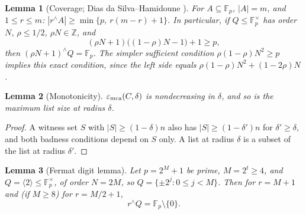 \documentclass[11pt]{article}
\newtheorem{lemma}[lemma]{Lemma}
\theoremstyle{definition}
\newcommand{\F}{\mathbb F}
\newcommand{\Z}{\mathbb Z}
\newcommand{\eps}{\varepsilon}
\begin{document}
\begin{lemma}[Coverage; Dias da Silva--Hamidoune \cite{DDSH94}]\label{lem:dsh}
For $A\subseteq\F_p$, $|A|=m$, and $1\le r\le m$: $|r^{\wedge}A|\ge\min\{p,\ r(m-r)+1\}$.  In particular, if $Q\le\F_p^\times$ has order $N$, $\rho\le1/2$, $\rho N\in\Z$, and
\[
        (\rho N+1)\bigl((1-\rho)N-1\bigr)+1\ge p,
\]
then $(\rho N+1)^{\wedge}Q=\F_p$.  The simpler sufficient condition $\rho(1-\rho)N^2\ge p$ implies this exact condition, since the left side equals $\rho(1-\rho)N^2+(1-2\rho)N$.
\end{lemma}

\begin{lemma}[Monotonicity]\label{lem:monotone}
$\eps_{\rm mca}(C,\delta)$ is nondecreasing in $\delta$, and so is the maximum list size at radius $\delta$.
\end{lemma}

\begin{proof}
A witness set $S$ with $|S|\ge(1-\delta)n$ also has $|S|\ge(1-\delta')n$ for $\delta'\ge\delta$, and both badness conditions depend on $S$ only.  A list at radius $\delta$ is a subset of the list at radius $\delta'$.
\end{proof}

\begin{lemma}[Fermat digit lemma]\label{lem:fermat}
Let $p=2^M+1$ be prime, $M=2^t\ge4$, and $Q=\langle2\rangle\le\F_p^\times$, of order $N=2M$, so $Q=\{\pm2^j:0\le j<M\}$.  Then for $r=M+1$ and (if $M\ge8$) for $r=M/2+1$,
\[
        r^{\wedge}Q=\F_p\setminus\{0\}.
\]
\end{lemma}
\end{document}
